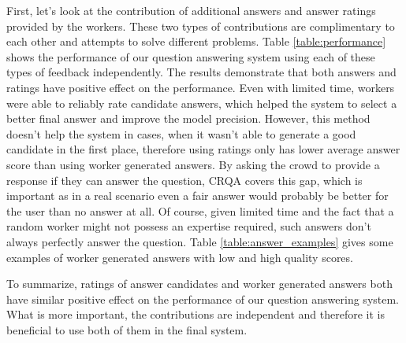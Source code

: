 \documentclass[letterpaper]{article}
\begin{document}
First, let's look at the contribution of additional answers and answer ratings provided by the workers.
These two types of contributions are complimentary to each other and attempts to solve different problems.
Table \ref{table:performance} shows the performance of our question answering system using each of these types of feedback independently.
The results demonstrate that both answers and ratings have positive effect on the performance.
Even with limited time, workers were able to reliably rate candidate answers, which helped the system to select a better final answer and improve the model precision.
However, this method doesn't help the system in cases, when it wasn't able to generate a good candidate in the first place, therefore using ratings only has lower average answer score than using worker generated answers.
By asking the crowd to provide a response if they can answer the question, CRQA covers this gap, which is important as in a real scenario even a fair answer would probably be better for the user than no answer at all.
Of course, given limited time and the fact that a random worker might not possess an expertise required, such answers don't always perfectly answer the question.
Table \ref{table:answer_examples} gives some examples of worker generated answers with low and high quality scores.

To summarize, ratings of answer candidates and worker generated answers both have similar positive effect on the performance of our question answering system.
What is more important, the contributions are independent and therefore it is beneficial to use both of them in the final system.
\end{document}
